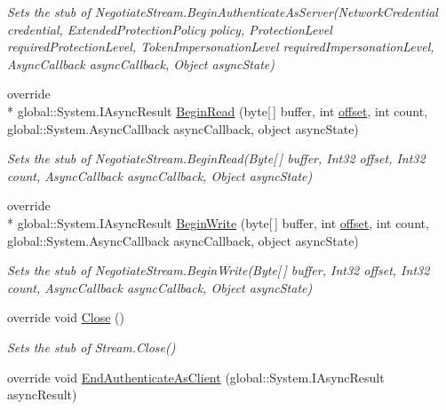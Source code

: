 \begin{DoxyCompactItemize}
\begin{DoxyCompactList}\small\item\em Sets the stub of Negotiate\-Stream.\-Begin\-Authenticate\-As\-Server(\-Network\-Credential credential, Extended\-Protection\-Policy policy, Protection\-Level required\-Protection\-Level, Token\-Impersonation\-Level required\-Impersonation\-Level, Async\-Callback async\-Callback, Object async\-State)\end{DoxyCompactList}\item 
override \\*
global\-::\-System.\-I\-Async\-Result \hyperlink{class_system_1_1_net_1_1_security_1_1_fakes_1_1_stub_negotiate_stream_af2312c7a6e709fcd840eaa5d4fba1a67}{Begin\-Read} (byte\mbox{[}$\,$\mbox{]} buffer, int \hyperlink{jquery-1_810_82_8js_a4a9f594d20d927164551fc7fa4751a2f}{offset}, int count, global\-::\-System.\-Async\-Callback async\-Callback, object async\-State)
\begin{DoxyCompactList}\small\item\em Sets the stub of Negotiate\-Stream.\-Begin\-Read(\-Byte\mbox{[}$\,$\mbox{]} buffer, Int32 offset, Int32 count, Async\-Callback async\-Callback, Object async\-State)\end{DoxyCompactList}\item 
override \\*
global\-::\-System.\-I\-Async\-Result \hyperlink{class_system_1_1_net_1_1_security_1_1_fakes_1_1_stub_negotiate_stream_aa271c456865bd32b673d80d6c1ef373c}{Begin\-Write} (byte\mbox{[}$\,$\mbox{]} buffer, int \hyperlink{jquery-1_810_82_8js_a4a9f594d20d927164551fc7fa4751a2f}{offset}, int count, global\-::\-System.\-Async\-Callback async\-Callback, object async\-State)
\begin{DoxyCompactList}\small\item\em Sets the stub of Negotiate\-Stream.\-Begin\-Write(\-Byte\mbox{[}$\,$\mbox{]} buffer, Int32 offset, Int32 count, Async\-Callback async\-Callback, Object async\-State)\end{DoxyCompactList}\item 
override void \hyperlink{class_system_1_1_net_1_1_security_1_1_fakes_1_1_stub_negotiate_stream_a1680f04d3e89636592d1daac65a36ec5}{Close} ()
\begin{DoxyCompactList}\small\item\em Sets the stub of Stream.\-Close()\end{DoxyCompactList}\item 
override void \hyperlink{class_system_1_1_net_1_1_security_1_1_fakes_1_1_stub_negotiate_stream_a1c6b09de0096c4d46c8a8ea51b6ab1e8}{End\-Authenticate\-As\-Client} (global\-::\-System.\-I\-Async\-Result async\-Result)

\end{DoxyCompactItemize}
